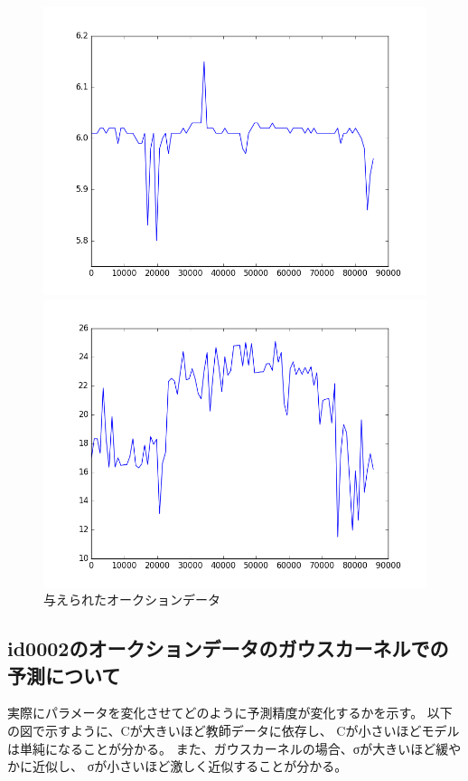 \documentclass[]{jsarticle}
\begin{document}
\begin{figure}[htbp]
\begin{minipage}[b]{0.5\hsize}
 \end{minipage}
 \begin{minipage}[b]{0.5\hsize}
  \includegraphics[scale=0.4]{./images/id0003.png}
 \end{minipage}
 \begin{minipage}[b]{0.5\hsize}
  \includegraphics[scale=0.4]{./images/id0004.png}
 \end{minipage}
 \caption{ 与えられたオークションデータ}
\end{figure}
\newpage
\subsection{ id0002のオークションデータのガウスカーネルでの予測について }
実際にパラメータを変化させてどのように予測精度が変化するかを示す。
以下の図で示すように、Cが大きいほど教師データに依存し、
Cが小さいほどモデルは単純になることが分かる。
また、ガウスカーネルの場合、σが大きいほど緩やかに近似し、
σが小さいほど激しく近似することが分かる。
\end{document}
